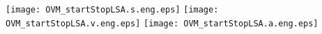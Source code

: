\documentclass[a4paper,12pt]{article}
\begin{document}

\begin{center}
\texttt{[image: OVM\_startStopLSA.s.eng.eps]} 
\texttt{[image: OVM\_startStopLSA.v.eng.eps]}
\texttt{[image: OVM\_startStopLSA.a.eng.eps]}
\end{center}

\end{document}
